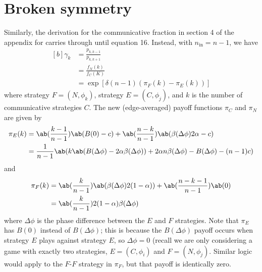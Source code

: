 \section{Broken symmetry}
Similarly, the derivation for the communicative fraction
in section 4 of the appendix for \cite{tripp2022evolutionary} carries
through until equation 16.
Instead, with $n_{\text{in}} = n-1$, we have
\begin{equation}
  \begin{aligned}[b]
  \gamma_k &= \frac{p_{k,k-1}}{p_{k,k+1}} \\
           &= \frac{f_N(k)}{f_C(K)} \\
           &= \exp[\delta (n-1) (\pi_F(k) - \pi_E(k))]
\end{aligned}
\end{equation}
where strategy $F=(N,\phi_k)$, strategy $E=(C,\phi_j)$, and $k$ is the
number of communicative strategies $C$.
The new (edge-averaged) payoff functions $\pi_C$ and $\pi_N$ are given by
\begin{align}
  \pi_E(k) &= \ab(\frac{k-1}{n-1}) \ab(B(0) - c)
                + \ab(\frac{n-k}{n-1}) \ab(\beta(\Delta\phi) 2\alpha - c) \\
           &= \frac{1}{n-1}
               \ab(k \ab(B(\Delta\phi) - 2 \alpha \beta(\Delta\phi))
                 + 2 \alpha n \beta(\Delta\phi) - B(\Delta\phi) - (n-1) c)
\end{align}
and
\begin{align}
  \pi_F(k) &= \ab(\frac{k}{n-1}) \ab(\beta(\Delta\phi) 2 (1-\alpha))
                + \ab(\frac{n-k-1}{n-1}) \ab(0) \\
           &= \ab(\frac{k}{n-1}) 2 (1-\alpha) \beta(\Delta\phi)
\end{align}
where $\Delta \phi$ is the phase difference between the $E$ and $F$
strategies.
Note that $\pi_E$ has $B(0)$ instead of $B(\Delta \phi)$; this is
because the $B(\Delta \phi)$ payoff occurs when strategy $E$ plays
against strategy $E$, so $\Delta \phi = 0$ (recall we are only
considering a game with exactly two strategies, $E = (C, \phi_i)$ and
$F = (N, \phi_j)$.
Similar logic would apply to the $F$-$F$ strategy in $\pi_F$, but that
payoff is identically zero.

